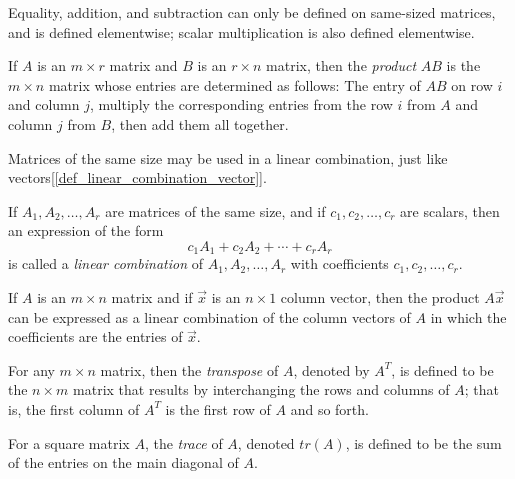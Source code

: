 \documentclass{report}
\begin{document}
			Equality, addition, and subtraction can only be defined on same-sized matrices, and is defined elementwise; scalar multiplication is also defined elementwise.
			
			\begin{defn}
				If $A$ is an $m \times r$ matrix and $B$ is an $r \times n$ matrix, then the \emph{product} $AB$ is the $m \times n$ matrix whose entries are determined as follows:
				The entry of $AB$ on row $i$ and column $j$, multiply the corresponding entries from the row $i$ from $A$ and column $j$ from $B$, then add them all together.
			\end{defn}
		
			Matrices of the same size may be used in a linear combination, just like vectors[\ref{def_linear_combination_vector}].
			
			\begin{defn}
				If $A_1, A_2, \dots, A_r$ are matrices of the same size, and if $c_1, c_2, \dots, c_r$ are scalars, then an expression of the form
				\begin{displaymath}
					c_1A_1+c_2A_2+\cdots+c_rA_r
				\end{displaymath}
				is called a \emph{linear combination} of $A_1, A_2, \dots, A_r$ with coefficients $c_1, c_2, \dots, c_r$.
			\end{defn}
			
			\begin{thm}
				If $A$ is an $m \times n$ matrix and if $\vec{x}$ is an $n \times 1$ column vector, then the product $A\vec{x}$ can be expressed as a linear combination of the column vectors of $A$ in which the coefficients are the entries of $\vec{x}$.
			\end{thm}
			
			\begin{defn}[Transpose]
				For any $m \times n$ matrix, then the \emph{transpose} of $A$, denoted by $A^T$, is defined to be the $n \times m$ matrix that results by interchanging the rows and columns of $A$; that is, the first column of $A^T$ is the first row of $A$ and so forth.
			\end{defn}
			
			\begin{defn}[Trace]
				For a square matrix $A$, the \emph{trace} of $A$, denoted $tr(A)$, is defined to be the sum of the entries on the main diagonal of $A$.
			
		\end{defn}
	
\end{document}
